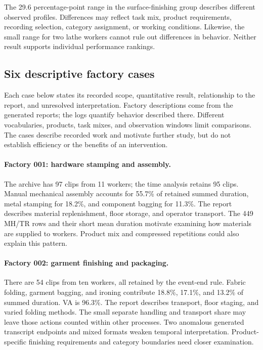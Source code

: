 The 29.6 percentage-point range in the surface-finishing group describes different observed profiles. Differences may reflect task mix, product requirements, recording selection, category assignment, or working conditions. Likewise, the small range for two lathe workers cannot rule out differences in behavior. Neither result supports individual performance rankings.

\subsection{Six descriptive factory cases}
\label{sec:factorycases}
Each case below states its recorded scope, quantitative result, relationship to the report, and unresolved interpretation. Factory descriptions come from the generated reports; the logs quantify behavior described there. Different vocabularies, products, task mixes, and observation windows limit comparisons. The cases describe recorded work and motivate further study, but do not establish efficiency or the benefits of an intervention.

\paragraph{Factory \textbf{001}: hardware stamping and assembly.}
The archive has 97 clips from 11 workers; the time analysis retains 95 clips. Manual mechanical assembly accounts for 55.7\% of retained summed duration, metal stamping for 18.2\%, and component bagging for 11.3\%. The report describes material replenishment, floor storage, and operator transport. The 449 MH/TR rows and their short mean duration motivate examining how materials are supplied to workers. Product mix and compressed repetitions could also explain this pattern.

\paragraph{Factory \textbf{002}: garment finishing and packaging.}
There are 54 clips from ten workers, all retained by the event-end rule. Fabric folding, garment bagging, and ironing contribute 18.8\%, 17.1\%, and 13.2\% of summed duration. VA is 96.3\%. The report describes transport, floor staging, and varied folding methods. The small separate handling and transport share may leave those actions counted within other processes. Two anomalous generated transcript endpoints and mixed formats weaken temporal interpretation. Product-specific finishing requirements and category boundaries need closer examination.


